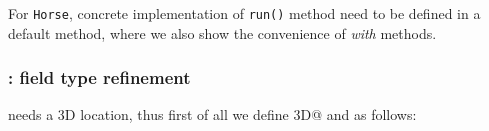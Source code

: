 
For \texttt{Horse}, concrete implementation of \texttt{run()} method
need to be defined in a default method, where 
we also show the convenience of \emph{with} methods.

\subsubsection{\Q@Bird@:  field type refinement}
\Q@Bird@ needs a 3D location, thus first of all we define \Q@Point3D@ and
as follows:

